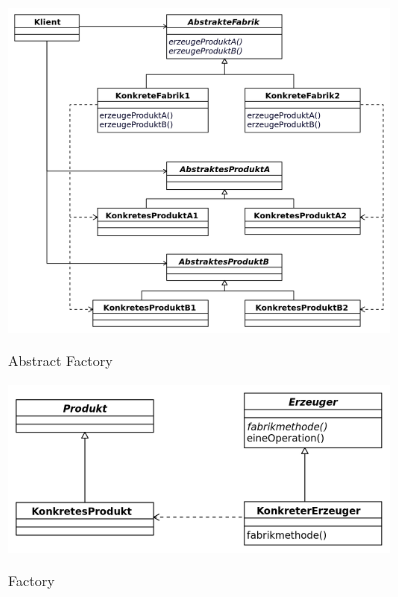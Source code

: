 \begin{figure}[htb]
    \centering
    \begin{minipage}[t]{0.45\linewidth}
		\centering
		\includegraphics[width=0.9\textwidth]{images/abstract_factory}
		\label{fig:abstract_factory}
		\caption{Abstract Factory}
	\end{minipage}%
	\hfill
    \begin{minipage}[t]{0.45\linewidth}
		\centering
		\includegraphics[width=0.9\textwidth]{images/factory}
		\label{fig:factory}
		\caption{Factory}
	\end{minipage}
\end{figure}


